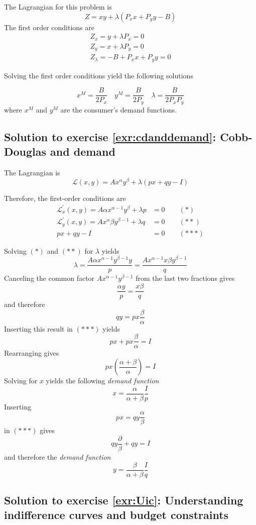 \documentclass[
  12pt,
  oneside]{book}
\theoremstyle{definition}
\theoremstyle{definition}
\theoremstyle{definition}
\theoremstyle{definition}
\theoremstyle{remark}
\begin{document}
The Lagrangian for this problem is
\[
  Z=x y+\lambda\left(P_{x} x+P_{y} y-B\right)
\]
The first order conditions are
\[
\begin{array}{l}
Z_{x}=y+\lambda P_{x}=0 \\
Z_{y}=x+\lambda P_{y}=0 \\
Z_{\lambda}=-B+P_{x} x+P_{y} y=0
\end{array}
\]

Solving the first order conditions yield the following solutions

\[
  x^{M}=\frac{B}{2 P_{x}} \quad y^{M}=\frac{B}{2 P_{y}} \quad \lambda=\frac{B}{2 P_{x} P_{y}}
\]
where \(x^{M}\) and \(y^{M}\) are the consumer's demand functions.

\hypertarget{sol:cdanddemand}{%
\subsection*{Solution to exercise \ref{exr:cdanddemand}: Cobb-Douglas and demand}\label{sol:cdanddemand}}

The Lagrangian is
\[
\mathcal{L}(x, y)=A x^{\alpha} y^{\beta}+\lambda(p x+q y-I)
\]

Therefore, the first-order conditions are
\[
    \begin{aligned}
        \mathcal{L}_{x}^{\prime}(x, y)=A \alpha x^{\alpha-1} y^{\beta}+\lambda p &=0 \qquad (*)\\
        \mathcal{L}_{y}^{\prime}(x, y)=A x^{\alpha} \beta y^{\beta-1}+\lambda q &=0  \qquad (**)\\
        p x+q y-I &=0  \qquad (***)
    \end{aligned}
\]

Solving \((*)\) and \((**)\) for \(\lambda\) yields
\[
\lambda=\frac{A \alpha x^{\alpha-1} y^{\beta-1} y}{p}=\frac{A x^{\alpha-1} x \beta y^{\beta-1}}{q}
\]
Canceling the common factor \(A x^{\alpha-1} y^{\beta-1}\) from the last two fractions gives
\[
    \frac{\alpha y}{p}=\frac{x \beta}{q}
\]
and therefore
\[
q y=p x \frac{\beta}{\alpha}
\]
Inserting this result in \((***)\) yields
\[
p x+p x \frac{\beta}{\alpha}=I
\]
Rearranging gives
\[
p x\left(\frac{\alpha+\beta}{\alpha}\right)=I
\]
Solving for \(x\) yields the following \textit{demand function}
\[
x=\frac{\alpha}{\alpha+\beta} \frac{I}{p}
\]
Inserting
\[
p x=q y \frac{\alpha}{\beta}
\]
in \((***)\) gives
\[
q y \frac{\partial}{\beta}+q y=I
\]
and therefore the \textit{demand function}
\[
y=\frac{\beta}{\alpha+\beta}  \frac{I}{q}
\]

\hypertarget{sol:Uic}{%
\subsection*{Solution to exercise \ref{exr:Uic}: Understanding indifference curves and budget constraints}\label{sol:Uic}}
\end{document}
